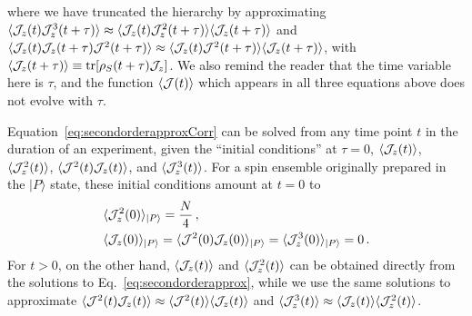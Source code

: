 \documentclass[aps,prd,10pt,twocolumn,superscriptaddress,floatfix,nofootinbib,amsmath,amssymb,altaffilletter,preprintnumbers]{revtex4-1}
\begin{document}
where we have truncated the hierarchy by approximating $\langle {\cal J}_z(t)  {\cal J}_z^3(t+\tau)  \rangle \approx \langle {\cal J}_z(t)  {\cal J}_z^2(t+\tau)  \rangle \langle {\cal J}_z (t+\tau)\rangle$  and $\langle {\cal J}_z(t) {\cal J}_z(t+\tau) {\cal J}^2(t+\tau)   \rangle \approx \langle {\cal J}_z(t)  {\cal J}^2(t+\tau)   \rangle \langle {\cal J}_z(t+\tau)\rangle$,
with  $\langle {\cal J}_z(t+\tau)\rangle \equiv {\rm tr}[\rho_S(t+\tau){\cal J}_z]$.  We also remind the reader that the time variable here is $\tau$, and the function $\langle {\cal J}(t) \rangle$ which appears in all three equations above does not evolve with $\tau$.




Equation~\eqref{eq:secondorderapproxCorr} can be solved from any time point $t$ in the duration of an experiment, given the ``initial conditions'' at $\tau=0$, 
$\langle {\cal J}_z(t) \rangle$, $\langle {\cal J}_z^2(t) \rangle$, $\langle {\cal J}^2(t) {\cal J}_z(t)  \rangle$, and 
$\langle {\cal J}_z^3(t) \rangle$.  For a spin ensemble originally prepared in the $|P\rangle$ state, these initial conditions amount at $t=0$ to
\begin{equation}
\begin{aligned}
& \langle {\cal J}_z^2(0) \rangle_{|P\rangle} = \frac{N}{4}\,, \\
& \langle {\cal J}_z(0) \rangle_{|P\rangle} = \langle {\cal J}^2(0) {\cal J}_z(0)  \rangle_{|P\rangle} = \langle {\cal J}_z^3(0) \rangle_{|P\rangle}=0\, .
\end{aligned}
\end{equation}
For $t >0$, on the other hand, $\langle {\cal J}_z(t)\rangle$ and $\langle {\cal J}_z^2(t) \rangle$ can be obtained directly from the solutions to Eq.~\eqref{eq:secondorderapprox}, while we use the same solutions to approximate $\langle {\cal J}^2(t) {\cal J}_z(t)  \rangle \approx \langle {\cal J}^2(t)\rangle \langle {\cal J}_z(t)  \rangle $ and 
$\langle {\cal J}_z^3(t) \rangle\approx \langle {\cal J}_z(t) \rangle \langle {\cal J}_z^2(t) \rangle$.
\end{document}
